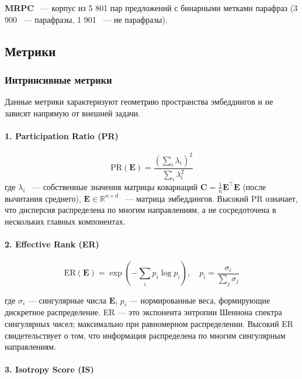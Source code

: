 \textbf{MRPC} ~--- корпус из 5 801 пар предложений с бинарными
метками парафраз
(3 900 ~--- парафразы, 1 901 ~--- не парафразы).

\subsection{Метрики}
\subsubsection{Интринсивные метрики}
Данные метрики характеризуют геометрию пространства эмбеддингов и не зависят
напрямую от внешней задачи.

\paragraph{1. Participation Ratio (PR)}

\begin{displaymath}
  \text{PR}(\mathbf{E}) = \frac{\left(\sum_{i}
  \lambda_i\right)^2}{\sum_{i} \lambda_i^2}
\end{displaymath}
где \(\lambda_i\) ~--- собственные значения матрицы ковариаций
\(\mathbf{C} = \frac{1}{n}\mathbf{E}^\top \mathbf{E}\) (после
вычитания среднего), \(\mathbf{E} \in \mathbb{R}^{n \times d}\) ~---
матрица эмбеддингов. Высокий PR означает, что дисперсия распределена
по многим направлениям, а не сосредоточена в нескольких главных компонентах.

\paragraph{2. Effective Rank (ER)}

\begin{displaymath}
  \text{ER}(\mathbf{E}) = \exp\!\left(-\sum_{i} p_i \log p_i\right),
  \quad p_i = \frac{\sigma_i}{\sum_j \sigma_j}
\end{displaymath}

где \(\sigma_i\) — сингулярные числа \(\mathbf{E}\), \(p_i\) —
нормированные веса, формирующие дискретное распределение. ER — это
экспонента энтропии Шеннона спектра сингулярных чисел; максимально
при равномерном распределении. Высокий ER свидетельствует о том, что
информация распределена по многим сингулярным направлениям.

\paragraph{3. Isotropy Score (IS)}

